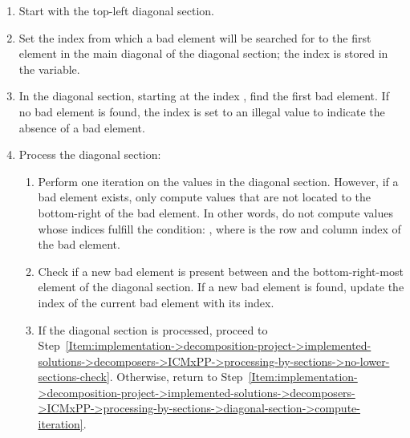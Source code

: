\begin{enumerate}
	\item \label{Item:implementation->decomposition-project->implemented-solutions->decomposers->ICMxPP->processing-by-sections->diagonal-section->start-at-top-left-diagonal-section}
		Start with the top-left diagonal section.
	\item \label{Item:implementation->decomposition-project->implemented-solutions->decomposers->ICMxPP->processing-by-sections->diagonal-section->reset-previous-bad-element}
		Set the index from which a bad element will be searched for to the first element in the main diagonal of the diagonal section; the index is stored in the  variable. 
	\item \label{Item:implementation->decomposition-project->implemented-solutions->decomposers->ICMxPP->processing-by-sections->diagonal-section->find-first-bad-element}
		In the diagonal section, starting at the index , find the first bad element. If no bad element is found, the index is set to an illegal value to indicate the absence of a bad element.
	\item \label{Item:implementation->decomposition-project->implemented-solutions->decomposers->ICMxPP->processing-by-sections->diagonal-section->process-diagonal-section}
		Process the diagonal section:
		\begin{enumerate}
			\item \label{Item:implementation->decomposition-project->implemented-solutions->decomposers->ICMxPP->processing-by-sections->diagonal-section->compute-iteration}
				Perform one iteration on the values in the diagonal section. However, if a bad element exists, only compute values that are not located to the bottom-right of the bad element. In other words, do not compute values whose indices fulfill the condition: , where  is the row and column index of the bad element.
			\item Check if a new bad element is present between  and the bottom-right-most element of the diagonal section. If a new bad element is found, update the index of the current bad element with its index.
			\item If the diagonal section is processed, proceed to Step~\ref{Item:implementation->decomposition-project->implemented-solutions->decomposers->ICMxPP->processing-by-sections->no-lower-sections-check}. Otherwise, return to Step~\ref{Item:implementation->decomposition-project->implemented-solutions->decomposers->ICMxPP->processing-by-sections->diagonal-section->compute-iteration}.

\end{enumerate}
\end{enumerate}

